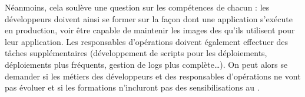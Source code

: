 Néanmoins, cela soulève une question sur les compétences de chacun : les développeurs doivent ainsi se former sur la façon dont une application s'exécute en production, voir être capable de maintenir les images des  qu'ils utilisent pour leur application. Les responsables d'opérations doivent également effectuer des tâches supplémentaires (développement de scripts pour les déploiements, déploiements plus fréquents, gestion de logs plus complète\ldots). On peut alors se demander si les métiers des développeurs et des responsables d'opérations ne vont pas évoluer et si les formations n'incluront pas des sensibilisations au \devops{}.
